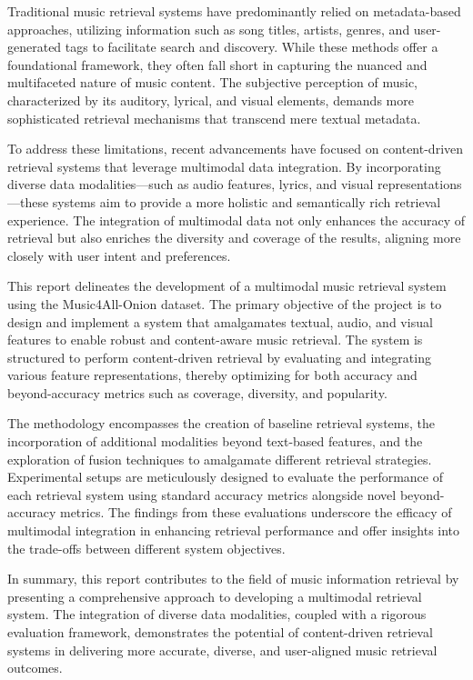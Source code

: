 \documentclass[sigconf]{acmart}
\begin{document}
Traditional music retrieval systems have predominantly relied on metadata-based approaches, utilizing information such as song titles, artists, genres, and user-generated tags to facilitate search and discovery. While these methods offer a foundational framework, they often fall short in capturing the nuanced and multifaceted nature of music content. The subjective perception of music, characterized by its auditory, lyrical, and visual elements, demands more sophisticated retrieval mechanisms that transcend mere textual metadata.

To address these limitations, recent advancements have focused on content-driven retrieval systems that leverage multimodal data integration. By incorporating diverse data modalities—such as audio features, lyrics, and visual representations—these systems aim to provide a more holistic and semantically rich retrieval experience. The integration of multimodal data not only enhances the accuracy of retrieval but also enriches the diversity and coverage of the results, aligning more closely with user intent and preferences.

This report delineates the development of a multimodal music retrieval system using the Music4All-Onion dataset. The primary objective of the project is to design and implement a system that amalgamates textual, audio, and visual features to enable robust and content-aware music retrieval. The system is structured to perform content-driven retrieval by evaluating and integrating various feature representations, thereby optimizing for both accuracy and beyond-accuracy metrics such as coverage, diversity, and popularity.

The methodology encompasses the creation of baseline retrieval systems, the incorporation of additional modalities beyond text-based features, and the exploration of fusion techniques to amalgamate different retrieval strategies. Experimental setups are meticulously designed to evaluate the performance of each retrieval system using standard accuracy metrics alongside novel beyond-accuracy metrics. The findings from these evaluations underscore the efficacy of multimodal integration in enhancing retrieval performance and offer insights into the trade-offs between different system objectives.

In summary, this report contributes to the field of music information retrieval by presenting a comprehensive approach to developing a multimodal retrieval system. The integration of diverse data modalities, coupled with a rigorous evaluation framework, demonstrates the potential of content-driven retrieval systems in delivering more accurate, diverse, and user-aligned music retrieval outcomes.
\end{document}
